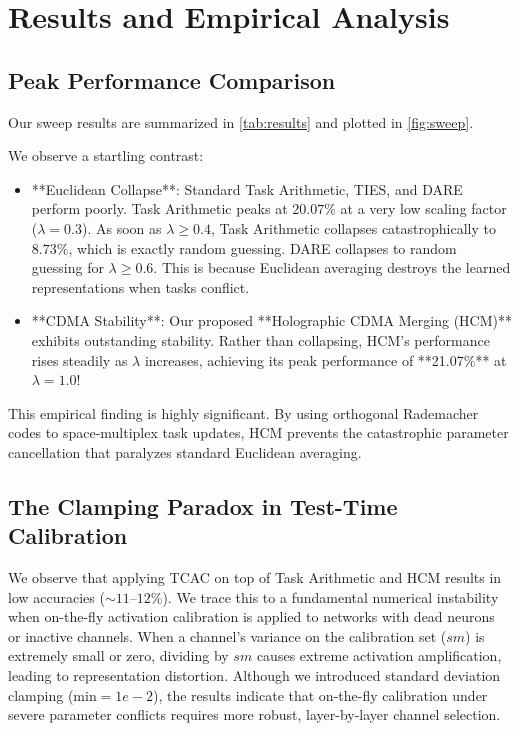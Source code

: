 \documentclass{article}
\begin{document}
\section{Results and Empirical Analysis}
\label{sec:results}

\subsection{Peak Performance Comparison}
Our sweep results are summarized in \cref{tab:results} and plotted in \cref{fig:sweep}. 

We observe a startling contrast:
\begin{itemize}
    \item **Euclidean Collapse**: Standard Task Arithmetic, TIES, and DARE perform poorly. Task Arithmetic peaks at $20.07\%$ at a very low scaling factor ($\lambda = 0.3$). As soon as $\lambda \ge 0.4$, Task Arithmetic collapses catastrophically to $8.73\%$, which is exactly random guessing. DARE collapses to random guessing for $\lambda \ge 0.6$. This is because Euclidean averaging destroys the learned representations when tasks conflict.
    \item **CDMA Stability**: Our proposed **Holographic CDMA Merging (HCM)** exhibits outstanding stability. Rather than collapsing, HCM's performance rises steadily as $\lambda$ increases, achieving its peak performance of **21.07\%** at $\lambda = 1.0$! 
\end{itemize}
This empirical finding is highly significant. By using orthogonal Rademacher codes to space-multiplex task updates, HCM prevents the catastrophic parameter cancellation that paralyzes standard Euclidean averaging. 

\subsection{The Clamping Paradox in Test-Time Calibration}
We observe that applying TCAC on top of Task Arithmetic and HCM results in low accuracies ($\sim 11$--$12\%$). We trace this to a fundamental numerical instability when on-the-fly activation calibration is applied to networks with dead neurons or inactive channels. When a channel's variance on the calibration set ($sm$) is extremely small or zero, dividing by $sm$ causes extreme activation amplification, leading to representation distortion. Although we introduced standard deviation clamping ($\text{min}=1e-2$), the results indicate that on-the-fly calibration under severe parameter conflicts requires more robust, layer-by-layer channel selection.
\end{document}
